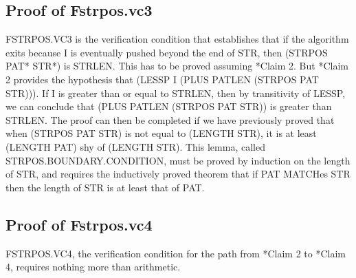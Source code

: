 \documentclass[11pt]{book}
\newcommand{\pubdefaulttextsize}{\large}
\begin{document}
\subsection{Proof of Fstrpos.vc3}
\pubdefaulttextsize
FSTRPOS.VC3 is the verification condition that establishes that
if the algorithm exits because I is eventually pushed beyond the end
of STR, then (STRPOS PAT* STR*) is STRLEN.  This has to be proved
assuming *Claim 2.  But *Claim 2 provides the hypothesis that
(LESSP I (PLUS PATLEN (STRPOS PAT STR))).  If I is greater than or equal to
STRLEN, then by transitivity of LESSP, we can conclude that (PLUS PATLEN (STRPOS PAT STR)) is greater than
STRLEN.  The proof can then be completed if we have previously proved
that when (STRPOS PAT STR) is not equal to (LENGTH STR), it is at least
(LENGTH PAT) shy of (LENGTH STR).  This lemma, called STRPOS.BOUNDARY.CONDITION,
must be proved by induction on the length of STR, and requires the
inductively proved theorem that if PAT MATCHes STR then the length of
STR is at least that of PAT.
\subsection{Proof of Fstrpos.vc4}
\pubdefaulttextsize
FSTRPOS.VC4, the verification condition for the path from *Claim 2
to *Claim 4, requires nothing more than arithmetic.
\end{document}
